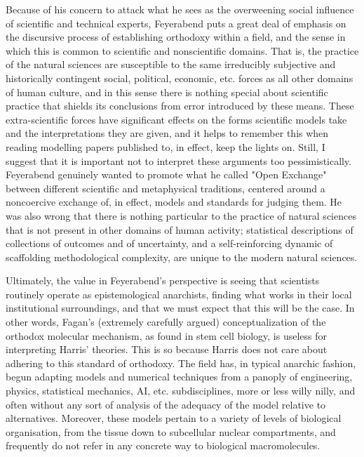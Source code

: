 Because of his concern to attack what he sees as the overweening social influence of scientific and technical experts, Feyerabend puts a great deal of emphasis on the discursive process of establishing orthodoxy within a field, and the sense in which this is common to scientific and nonscientific domains. That is, the practice of the natural sciences are susceptible to the same irreducibly subjective and historically contingent social, political, economic, etc. forces as all other domains of human culture, and in this sense there is nothing special about scientific practice that shields its conclusions from error introduced by these means. These extra-scientific forces have significant effects on the forms scientific models take and the interpretations they are given, and it helps to remember this when reading modelling papers published to, in effect, keep the lights on. Still, I suggest that it is important not to interpret these arguments too pessimistically. Feyerabend genuinely wanted to promote what he called "Open Exchange" between different scientific and metaphysical traditions, centered around a noncoercive exchange of, in effect, models and standards for judging them. He was also wrong that there is nothing particular to the practice of natural sciences that is not present in other domains of human activity; statistical descriptions of collections of outcomes and of uncertainty, and a self-reinforcing dynamic of scaffolding methodological complexity, are unique to the modern natural sciences.

Ultimately, the value in Feyerabend's perspective is seeing that scientists routinely operate as epistemological anarchists, finding what works in their local institutional surroundings, and that we must expect that this will be the case. In other words, Fagan's (extremely carefully argued) conceptualization of the orthodox molecular mechanism, as found in stem cell biology, is useless for interpreting Harris' theories. This is so because Harris does not care about adhering to this standard of orthodoxy. The field has, in typical anarchic fashion, begun adapting models and numerical techniques from a panoply of engineering, physics, statistical mechanics, AI, etc. subdisciplines, more or less willy nilly, and often without any sort of analysis of the adequacy of the model relative to alternatives. Moreover, these models pertain to a variety of levels of biological organisation, from the tissue down to subcellular nuclear compartments, and frequently do not refer in any concrete way to biological macromolecules.

